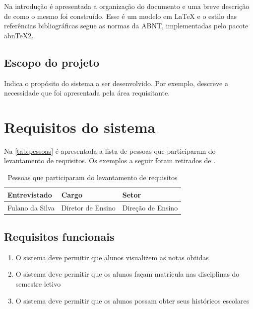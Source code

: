 \documentclass[11pt]{report}
\begin{document}
Na introdução é apresentada a organização do documento e uma breve descrição de como o mesmo foi construído.   Esse é um modelo em \LaTeX \cite{lamport94} e o estilo das referências bibliográficas segue as normas da ABNT, implementadas pelo pacote abnTeX2.

\lipsum[3]

\section{Escopo do projeto}
\label{sec:escopo}

Indica o propósito do sistema a ser desenvolvido. Por exemplo, descreve a necessidade que foi apresentada pela área requisitante. \lipsum[2]


\chapter{Requisitos do sistema}

Na \autoref{tab:pessoas} é apresentada a lista de pessoas que participaram do levantamento de requisitos. Os exemplos a seguir foram retirados de \cite{bezerra02}.

\begin{table}[!htpb]
\caption{Pessoas que participaram do levantamento de requisitos}
\label{tab:pessoas}
\begin{center}
\begin{tabular}{|l|l|l|}\hline
\textbf{Entrevistado} & \textbf{Cargo} & \textbf{Setor} \\\hline\hline
Fulano da Silva & Diretor de Ensino & Direção de Ensino\\\hline
\end{tabular}
\end{center}
\end{table}


\section{Requisitos funcionais}

\begin{enumerate}
	\item O sistema deve permitir que alunos visualizem as notas obtidas
	\item O sistema deve permitir que os alunos façam matrícula nas disciplinas do semestre letivo
	\item O sistema deve permitir que os alunos possam obter seus históricos escolares
\end{enumerate}
\end{document}
